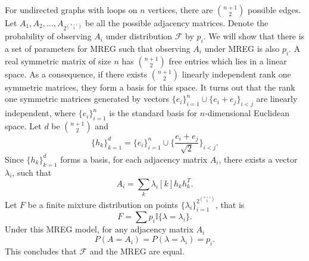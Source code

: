 \documentclass[10pt,journal,compsoc]{IEEEtran}
\newenvironment{proof}[1][Proof]{\begin{trivlist}
		\item[\hskip \labelsep {\bfseries #1}]}{\end{trivlist}}
\begin{document}
\begin{proof} [Proof of Theorem 2.1]
 For undirected graphs with loops on $n$ vertices, there are ${n+1}\choose{2}$ possible edges. Let $A_1,A_2,...,A_{2^{{n+1}\choose{2}}}$ be all the possible adjacency matrices. Denote the probability of observing $A_i$ under distribution $\mathcal{F}$ by $p_i$. We will show that there is a set of parameters for MREG such that observing $A_i$ under MREG is also $p_i$. 
 A real symmetric matrix of size $n$ has ${n+1}\choose{2}$ free entries which lies in a linear space. As a consequence, if there exists ${n+1}\choose{2}$ linearly independent rank one symmetric matrices, they form a basis for this space. It turns out that the rank one symmetric matrices generated by vectors $\{e_i\}_{i=1}^{n} \cup \{e_i+e_j\}_{i<j}$ are linearly independent, where $\{e_i\}_{i=1}^{n}$ is the standard basis for $n$-dimensional Euclidean space.
 Let $d$ be ${n+1}\choose{2} $  and 
 \[\{h_k\}_{k=1}^d = \{e_i\}_{i=1}^{n} \cup \{\frac{e_i+e_j}{\sqrt{2}}\}_{i<j}.\] 
 Since $\{h_k\}_{k=1}^d$ forms a basis, for each adjacency matrix $A_i$, there exists a vector $\lambda_i$, such that 
 \[A_i =\sum_{k} \lambda_i [k] h_k  h_k^T.\] Let $F$ be a finite mixture distribution on points $\{\lambda_i\}_{i=1}^{2^{{n+1}\choose{2}}}$, that is 
 \[F = \sum p_i \mathbb{I} \{\lambda = \lambda_i\}.\]
  Under this MREG model, for any adjacency matrix $A_i$
 \[P(A=A_i) = P(\lambda = \lambda_i) = p_i .\]
 This concludes that $\mathcal{F}$ and the MREG are equal.
 \end{proof}
\end{document}
